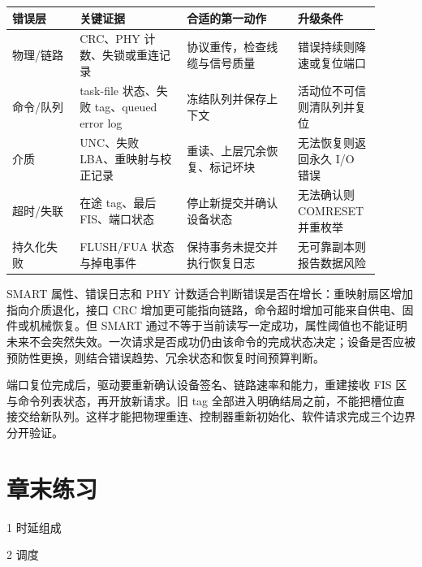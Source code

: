 \begin{longtable}{L{0.17\linewidth}L{0.27\linewidth}L{0.28\linewidth}L{0.18\linewidth}}
\toprule
错误层 & 关键证据 & 合适的第一动作 & 升级条件 \\
\midrule
物理/链路 & CRC、PHY 计数、失锁或重连记录 & 协议重传，检查线缆与信号质量 & 错误持续则降速或复位端口 \\\tablerowrule
命令/队列 & task-file 状态、失败 tag、queued error log & 冻结队列并保存上下文 & 活动位不可信则清队列并复位 \\\tablerowrule
介质 & UNC、失败 LBA、重映射与校正记录 & 重读、上层冗余恢复、标记坏块 & 无法恢复则返回永久 I/O 错误 \\\tablerowrule
超时/失联 & 在途 tag、最后 FIS、端口状态 & 停止新提交并确认设备状态 & 无法确认则 COMRESET 并重枚举 \\\tablerowrule
持久化失败 & FLUSH/FUA 状态与掉电事件 & 保持事务未提交并执行恢复日志 & 无可靠副本则报告数据风险 \\
\bottomrule
\end{longtable}


SMART 属性、错误日志和 PHY 计数适合判断错误是否在增长：重映射扇区增加指向介质退化，接口 CRC 增加更可能指向链路，命令超时增加可能来自供电、固件或机械恢复。但 SMART 通过不等于当前读写一定成功，属性阈值也不能证明未来不会突然失效。一次请求是否成功仍由该命令的完成状态决定；设备是否应被预防性更换，则结合错误趋势、冗余状态和恢复时间预算判断。

端口复位完成后，驱动要重新确认设备签名、链路速率和能力，重建接收 FIS 区与命令列表状态，再开放新请求。旧 tag 全部进入明确结局之前，不能把槽位直接交给新队列。这样才能把物理重连、控制器重新初始化、软件请求完成三个边界分开验证。

\section*{章末练习}

\begin{chapterexercise}{1}
时延组成
\end{chapterexercise}

\begin{chapterexercise}{2}
调度
\end{chapterexercise}

